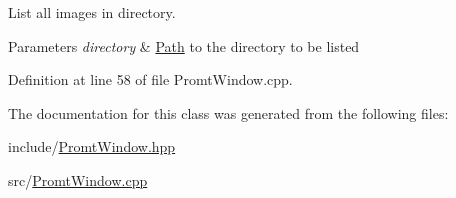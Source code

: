 List all images in directory. 


\begin{DoxyParams}{Parameters}
{\em directory} & \mbox{\hyperlink{namespacePath}{Path}} to the directory to be listed \\
\hline
\end{DoxyParams}


Definition at line 58 of file Promt\+Window.\+cpp.



The documentation for this class was generated from the following files\+:\begin{DoxyCompactItemize}
\item 
include/\mbox{\hyperlink{PromtWindow_8hpp}{Promt\+Window.\+hpp}}\item 
src/\mbox{\hyperlink{PromtWindow_8cpp}{Promt\+Window.\+cpp}}\end{DoxyCompactItemize}
